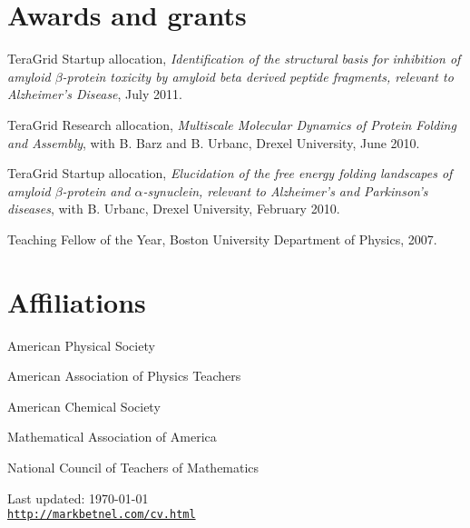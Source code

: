 \documentclass[letterpaper]{article}
\def\footerlink{http://markbetnel.com/cv.html}
\renewenvironment{itemize}{
  \begin{list}{}{
    \setlength{\leftmargin}{1em}
  }
}{
  \end{list}
}
\begin{document}
\section*{Awards and grants}
\begin{itemize}
       \item  TeraGrid Startup allocation, \emph{Identification of the
           structural basis for inhibition of amyloid $\beta$-protein
           toxicity by amyloid beta derived peptide fragments,
           relevant to Alzheimer's Disease}, July 2011. 
	\item TeraGrid Research allocation, \emph{Multiscale Molecular 
          Dynamics of Protein Folding and Assembly}, with B. Barz and 
          B. Urbanc, Drexel University, 
	June 2010.
    \item TeraGrid Startup allocation, \emph{Elucidation of the free energy folding 
landscapes of amyloid $\beta$-protein and $\alpha$-synuclein, relevant to 
Alzheimer's and Parkinson's diseases}, with B. Urbanc, Drexel University, 
February 2010.  
	\item Teaching Fellow of the Year, Boston University Department of Physics, 2007.

\end{itemize}


\section*{Affiliations}
\begin{itemize}
	\item American Physical Society
	\item American Association of Physics Teachers
	\item American Chemical Society
        \item Mathematical Association of America
        \item National Council of Teachers of Mathematics
\end{itemize}

\bigskip

\begin{center}
  \begin{footnotesize}
    Last updated: \today \\
    \href{\footerlink}{\texttt{\footerlink}}
  \end{footnotesize}
\end{center}
\end{document}

